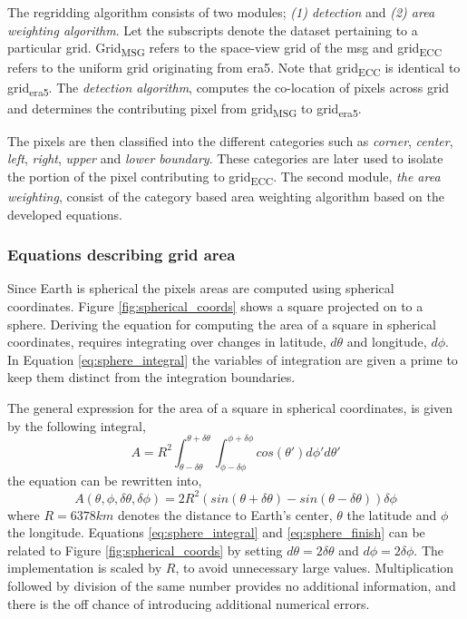 The regridding algorithm consists of two modules; \textit{(1) detection} and \textit{(2) area weighting algorithm}. Let the subscripts denote the dataset pertaining to a particular grid. Grid\textsubscript{MSG} refers to the space-view grid of the \acrlong{msg} and grid\textsubscript{ECC} refers to the uniform grid originating from \acrshort{era5}. Note that grid\textsubscript{ECC} is identical to  grid\textsubscript{\acrshort{era5}}. The \textit{detection algorithm}, computes the co-location of pixels across grid and determines the contributing pixel from grid\textsubscript{MSG} to grid\textsubscript{\acrshort{era5}}.

The pixels are then classified into the different categories such as \textit{corner}, \textit{center}, \textit{left}, \textit{right}, \textit{upper} and \textit{lower boundary}. These categories are later used to isolate the portion of the pixel contributing to grid\textsubscript{ECC}.
The second module, \textit{the area weighting}, consist of the category based area weighting algorithm based on the developed equations.

\subsubsection{Equations describing grid area}
Since Earth is spherical the pixels areas are computed using spherical coordinates. Figure \ref{fig:spherical_coords} shows a square projected on to a sphere. Deriving the equation for computing the area of a square in spherical coordinates, requires integrating over changes in latitude, $d\theta$ and longitude, $d\phi$. In Equation \eqref{eq:sphere_integral} the variables of integration are given a prime to keep them distinct from the integration boundaries.

The general expression for the area of a square in spherical coordinates, is given by the following integral,
\begin{equation} \label{eq:sphere_integral}
    A = R^2\int_{ \theta - \delta \theta }^{\theta + \delta \theta} \int_{ \phi - \delta \phi }^{\phi + \delta \phi} cos\left( \theta' \right) d\phi' d\theta'
\end{equation}
the equation can be rewritten into,
\begin{equation} \label{eq:sphere_finish}
    A \left( \theta, \phi, \delta \theta, \delta \phi   \right)= 2R^2 \left( sin\left( \theta + \delta \theta  \right) - sin\left(  \theta - \delta \theta  \right) \right) \delta \phi
\end{equation}
where $R=6378km$ denotes the distance to Earth's center, $\theta$ the latitude and $\phi$ the longitude. Equations \eqref{eq:sphere_integral} and \eqref{eq:sphere_finish} can be related to Figure \ref{fig:spherical_coords} by setting $d \theta = 2 \delta \theta$ and $d \phi = 2 \delta \phi$. The implementation is scaled by $R$, to avoid unnecessary large values. Multiplication followed by division of the same number provides no additional information, and there is the off chance of introducing additional numerical errors. 

